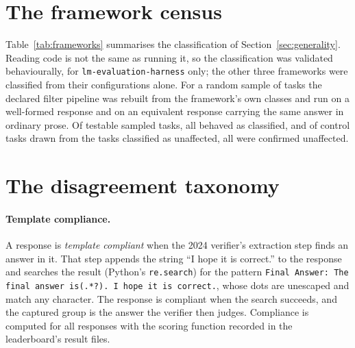 \section{The framework census}
\label{app:frameworks}



Table~\ref{tab:frameworks} summarises the classification of Section~\ref{sec:generality}.
Reading code is not the same as running it, so the classification was validated behaviourally,
for \texttt{lm-evaluation-harness} only; the other three frameworks were classified from their
configurations alone. For a random sample of tasks the declared filter pipeline was rebuilt from the framework's own
classes and run on a well-formed response and on an equivalent response carrying the same
answer in ordinary prose. Of \CensusValidTestable{} testable sampled tasks, all
\CensusValidConfirmed{} behaved as classified, and of \CensusControlN{} control tasks drawn
from the tasks classified as unaffected, all \CensusControlClean{} were confirmed unaffected.

\section{The disagreement taxonomy}
\label{app:gallery}

\paragraph{Template compliance.}
A response is \emph{template compliant} when the 2024 verifier's extraction step finds an answer in
it. That step appends the string ``I hope it is correct.'' to the response and searches the result
(Python's \texttt{re.search}) for the pattern
\texttt{Final Answer: The final answer is(.*?). I hope it is correct.}, whose dots are unescaped
and match any character. The response is compliant when the search succeeds, and the captured
group is the answer the verifier then judges. Compliance is computed for all \NumRows{} responses
with the scoring function recorded in the leaderboard's result files.

